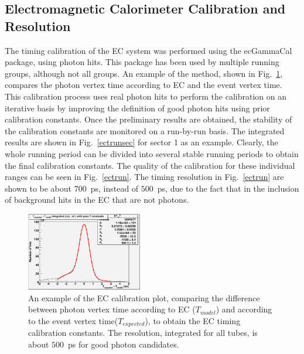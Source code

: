 \subsection{\label{sec:calib.ec}Electromagnetic Calorimeter Calibration and Resolution}

The timing calibration of the EC system was performed using the ecGammaCal package, using photon hits. This package has been used by multiple running groups, although not all groups. An example of the method, shown in Fig.~\ref{ectall}, compares the photon vertex time according to EC and the event vertex time. This calibration process uses real photon hits to perform the calibration on an iterative basis by improving the definition of good photon hits using prior calibration constants. Once the preliminary results are obtained, the stability of the calibration constants are monitored on a run-by-run basis. The integrated results are shown in Fig.~\ref{ectrunsec} for sector 1 as an example. Clearly, the whole running period can be divided into several stable running periods to obtain the final calibration constants. The quality of the calibration for these individual ranges can be seen in Fig.~\ref{ectrun}. The timing resolution in Fig.~\ref{ectrun} are shown to be about $700$~ps, instead of $500$~ps, due to the fact that in the inclusion of background hits in the EC that are not photons.

\begin{figure}[htpb]
\begin{center}
 \includegraphics[width=0.45\textwidth]{figures/calib/ec/ec_vtimeall.eps}
  \caption{An example of the EC calibration plot, comparing the difference between photon vertex time according to EC ($T_{model}$) and according to the event vertex time($T_{expected}$), to obtain the EC timing calibration constants. The resolution, integrated for all tubes, is about $500$~ps for good photon candidates.}
  \label{ectall}
  \end{center}
\end{figure}


